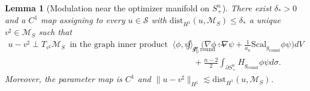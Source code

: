 \documentclass[11pt,reqno,a4paper]{amsart}
\numberwithin{equation}{section}
\theoremstyle{plain}
\newtheorem{lemma}[theorem]{Lemma}
\newcommand{\Scal}{\mathrm{Scal}}
\theoremstyle{remark}
\theoremstyle{plain}
\begin{document}
\begin{lemma}[Modulation near the optimizer manifold on $S^n_+$]\label{lem:modulation-sphere}
There exist $\delta_*>0$ and a $C^1$ map assigning to every $u\in\mathcal S$ with $\mathrm{dist}_{H^1}(u,\mathcal M_S)\le\delta_*$ a unique $v^\sharp\in\mathcal M_S$ such that
\begin{align*}
  u-v^\sharp\perp T_{v^\sharp}\mathcal M_S\ \text{ in the graph inner product }\ \langle \phi,\psi\rangle_{E,\mathrm{round}}
  := &\int_{S^n_+}\Big(\nabla\phi\cdot\nabla\psi+\tfrac{1}{a_n}\Scal_{g_{\mathrm{round}}}\phi\psi\Big)dV\\&\quad
   + \tfrac{n-2}{2}\int_{\partial S^n_+} H_{g_{\mathrm{round}}}\phi\psi d\sigma.
\end{align*}
Moreover, the parameter map is $C^1$ and $\|u-v^\sharp\|_{H^1}\lesssim \mathrm{dist}_{H^1}(u,\mathcal M_S)$.
\end{lemma}
\end{document}
